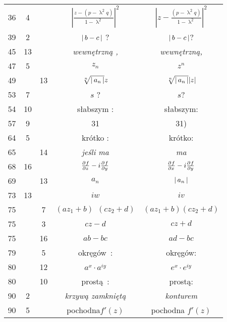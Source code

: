 \documentclass[a4paper,11pt]{article}
\begin{document}
\begin{center}
\begin{tabular}{|c|c|c|c|c|}
    36  &  4 & & $\left| \frac{ z - ( p - \uplambda^{ 2 } q) }{ 1
                 - \uplambda^{ 2 } } \right|^{ 2 }$
           & $\left| z - \frac{ ( p - \uplambda^{ 2 } q) }{ 1
             - \uplambda^{ 2 } } \right|^{ 2 }$ \\
    39  &  2 & & $\left| \,  b - c  \, \right|$ ? & $\left| \,  b - c  \, \right|$? \\
    45  & 13 & & \emph{wewnętrzną ,} & \emph{wewnętrzną,} \\
    47  &  5 & & $z_{ n }$ & $z^{ n }$ \\
    49  & & 13 & $\sqrt[n]{ \left| \,  a_{ n }  \, \right| } z$
           & $\sqrt[n]{ \left| \,  a_{ n }  \, \right| } | z |$ \\
    53  &  7 & & $s$ ? & $s$? \\
    54  & 10 & & słabszym : & słabszym: \\
    57  &  9 & & 31 & 31) \\
    64  &  5 & & krótko : & krótko: \\
    65  & & 14 & \emph{jeśli ma} & \emph{ma} \\
    68  & 16 & & $\frac{ \partial^{  } {  f  } }{ \partial {  z  }^{  } } - i \frac{ \partial^{  } {  f  } }{ \partial {  y  }^{  } }$
           & $\frac{ \partial^{  } {  f  } }{ \partial {  x  }^{  } } - i \frac{ \partial^{  } {  f  } }{ \partial {  y  }^{  } }$ \\
    69  & & 13 & $a_{ n }$ & $\left| \,  a_{ n }  \, \right|$ \\
    73  & 13 & & $iw$ & $iv$ \\
    75  & &  7 & $( a z_{ 1 } + b )\;\, ( c z_{ 2 } + d )$
           & $( a z_{ 1 } + b ) ( c z_{ 2 } + d )$ \\
    75  & &  3 & $c z - d$ & $c z + d$ \\
    75  & & 16 & $ab - bc$ & $ad - bc$ \\
    79  & &  5 & okręgów~: & okręgów: \\
    80  & & 12 & $a^{ x } \cdot a^{ iy }$ & $e^{ x } \cdot e^{ iy }$ \\
    80  & & 10 & prostą~: & prostą: \\
    90  &  2 & & \emph{krzywą zamkniętą} & \emph{konturem} \\
    90  &  5 & & pochodna$f'( z )$ & pochodna $f'( z )$ \\
    \hline
  \end{tabular}


\end{center}
\end{document}
